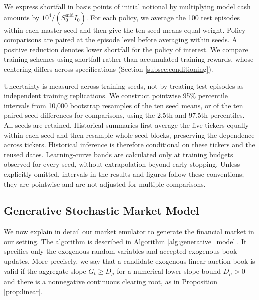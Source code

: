 \documentclass[11pt]{article}
\begin{document}
We express shortfall in basis points of initial notional by multiplying model cash amounts by $10^4/(S_0^{\mathrm{mid}}I_0)$. For each policy, we average the 100 test episodes within each master seed and then give the ten seed means equal weight. Policy comparisons are paired at the episode level before averaging within seeds. A positive reduction denotes lower shortfall for the policy of interest. We compare training schemes using shortfall rather than accumulated training rewards, whose centering differs across specifications (Section \ref{subsec:conditioning}).\vspace{0.5em}

Uncertainty is measured across training seeds, not by treating test episodes as independent training replications. We construct pointwise 95\% percentile intervals from 10,000 bootstrap resamples of the ten seed means, or of the ten paired seed differences for comparisons, using the 2.5th and 97.5th percentiles. All seeds are retained. Historical summaries first average the five tickers equally within each seed and then resample whole seed blocks, preserving the dependence across tickers. Historical inference is therefore conditional on these tickers and the reused dates. Learning-curve bands are calculated only at training budgets observed for every seed, without extrapolation beyond early stopping. Unless explicitly omitted, intervals in the results and figures follow these conventions; they are pointwise and are not adjusted for multiple comparisons.
\endgroup

\subsection{Generative Stochastic Market Model}
\label{sub:generative}

We now explain in detail our market emulator to generate the financial market in our setting.
The algorithm is described in Algorithm \ref{alg:generative_model}. It specifies only the exogenous random variables and accepted exogenous book updates. More precisely, we say that a candidate exogenous linear auction book is valid if the aggregate slope $G_t \geqslant D_\mu$ for a numerical lower slope bound $D_\mu >0$ and there is a nonnegative continuous clearing root, as in Proposition \ref{prop:linear}.\vspace{0.5em}
\end{document}
